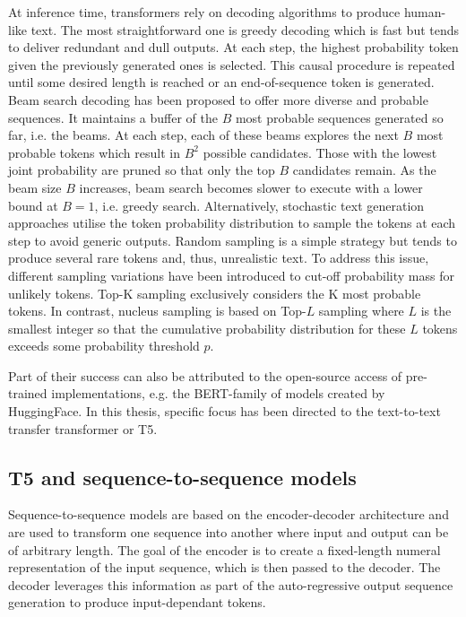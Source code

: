 
At inference time, transformers rely on decoding algorithms to produce human-like text. The most straightforward one is greedy decoding which is fast but tends to deliver redundant and dull outputs\cite{issuesDecodingSamplingNLP}. At each step, the highest probability token given the previously generated ones is selected. This causal procedure is repeated until some desired length is reached or an end-of-sequence token is generated. Beam search decoding has been proposed to offer more diverse and probable sequences. It maintains a buffer of the $B$ most probable sequences generated so far, i.e. the beams. At each step, each of these beams explores the next $B$ most probable tokens which result in $B^2$ possible candidates. Those with the lowest joint probability are pruned so that only the top $B$ candidates remain. As the beam size $B$ increases, beam search becomes slower to execute with a lower bound at $B=1$, i.e. greedy search. Alternatively, stochastic text generation approaches utilise the token probability distribution to sample the tokens at each step to avoid generic outputs. Random sampling is a simple strategy but tends to produce several rare tokens and, thus, unrealistic text. To address this issue, different sampling variations have been introduced to cut-off probability mass for unlikely tokens. Top-K sampling exclusively considers the K most probable tokens. In contrast, nucleus sampling\cite{nucleusSampling} is based  on Top-$L$ sampling where $L$ is the smallest integer so that the cumulative probability distribution for these $L$ tokens exceeds some probability threshold $p$.



Part of their success can also be attributed to the open-source access of pre-trained implementations, e.g. the BERT-family of models created by HuggingFace. In this thesis, specific focus has been directed to the text-to-text transfer transformer or T5\cite{T5}.

\subsection{T5 and sequence-to-sequence models}

Sequence-to-sequence models are based on the encoder-decoder architecture and are used to transform one sequence into another where input and output can be of arbitrary length. The goal of the encoder is to create a fixed-length numeral representation of the input sequence, %
which is then passed to the decoder. The decoder leverages this information as part of the auto-regressive output sequence generation to produce input-dependant tokens.

